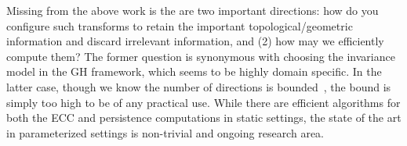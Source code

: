  Missing from the above work is the are two important directions: how do you configure such transforms to retain the important topological/geometric information and discard irrelevant information, and (2) how may we efficiently compute them? 
The former question is synonymous with choosing the invariance model in the GH framework, which seems to be highly domain specific. 
 In the latter case, though we know the number of directions is bounded~\cite{}, the bound is simply too high to be of any practical use. While there are efficient algorithms for both the ECC and persistence computations in static settings, the state of the art in parameterized settings is non-trivial and ongoing research area.
